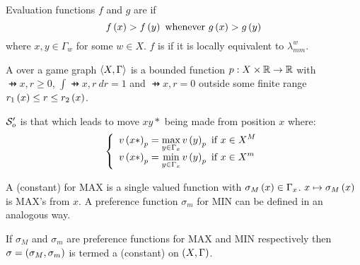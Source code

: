 \begin{defi}
Evaluation functions $f$ and $g$ are  if
\begin{equation}
f\left(x\right)>f\left(y\right)\mbox{ whenever }g\left(x\right)>g\left(y\right)
\end{equation}
where $x,y\in\Gamma_w$ for some $w\in X$. $f$ is  if it is locally equivalent to $\lambda_{mm}^w$.
\cite{conf/ijcai/Boffey73}
\end{defi}

\begin{defi}
A  over a game graph $\left\langle X,\Gamma\right\rangle$ is a bounded function $p:X\times\mathbb{R} \rightarrow \mathbb{R}$ with $\pfun{x,r}\geq0$, $\displaystyle\int{\pfun{x,r}\ dr}=1$ and $\pfun{x,r}=0$ outside some finite range $r_1\left(x\right)\leq r\leq r_2\left(x\right)$.
\cite{conf/ijcai/Boffey73}
\end{defi}

\begin{defi}
$\mathcal{S}_o'$ is that  which leads to move $xy*$ being made from position $x$ where:
\begin{equation}
\left\{\begin{array}{l}v\left(x*\right)_p=\displaystyle\max_{y\in\Gamma_x}v\left(y\right)_p\mbox{ if }x\in X^M\\
v\left(x*\right)_p=\displaystyle\min_{y\in\Gamma_x}v\left(y\right)_p\mbox{ if }x\in X^m\end{array}\right.
\end{equation}
\cite{conf/ijcai/Boffey73}
\end{defi}

\begin{defi}
A (constant)  for MAX is a single valued function  with $\sigma_M\left(x\right)\in\Gamma_x$. $x\mapsto\sigma_M\left(x\right)$ is MAX's  from $x$. A preference function $\sigma_m$ for MIN can be defined in an analogous way.
\cite{conf/ijcai/Boffey73}
\end{defi}

\begin{defi}
If $\sigma_M$ and $\sigma_m$ are preference functions for MAX and MIN respectively then $\sigma=\left( \sigma_M,\sigma_m\right)$ is termed a (constant)  on $\left( X,\Gamma\right)$.
\cite{conf/ijcai/Boffey73}
\end{defi}

